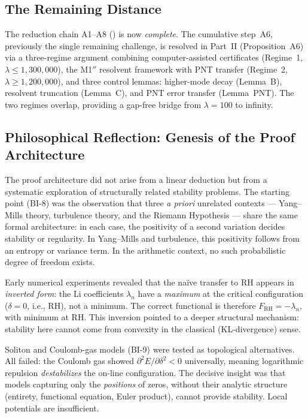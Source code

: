 \documentclass[12pt,a4paper]{article}
\theoremstyle{definition}
\theoremstyle{remark}
\begin{document}
\subsection{The Remaining Distance}

The reduction chain A1--A8 () is now \emph{complete}. The cumulative step~A6, previously the single remaining challenge, is resolved in Part~II (Proposition~A6) via a three-regime argument combining computer-assisted certificates (Regime~1, $\lambda \leq 1{,}300{,}000$), the M1$''$ resolvent framework with PNT transfer (Regime~2, $\lambda \geq 1{,}200{,}000$), and three control lemmas: higher-mode decay (Lemma~B), resolvent truncation (Lemma~C), and PNT error transfer (Lemma~PNT). The two regimes overlap, providing a gap-free bridge from $\lambda = 100$ to infinity.

\subsection{Philosophical Reflection: Genesis of the Proof Architecture}

The proof architecture did not arise from a linear deduction but from a systematic exploration of structurally related stability problems. The starting point (BI-8) was the observation that three \emph{a priori} unrelated contexts --- Yang--Mills theory, turbulence theory, and the Riemann Hypothesis --- share the same formal architecture: in each case, the positivity of a second variation decides stability or regularity. In Yang--Mills and turbulence, this positivity follows from an entropy or variance term. In the arithmetic context, no such probabilistic degree of freedom exists.

Early numerical experiments revealed that the na\"ive transfer to RH appears in \emph{inverted form}: the Li coefficients $\lambda_n$ have a \emph{maximum} at the critical configuration ($\delta = 0$, i.e., RH), not a minimum. The correct functional is therefore $F_{\mathrm{RH}} = -\lambda_n$, with minimum at RH. This inversion pointed to a deeper structural mechanism: stability here cannot come from convexity in the classical (KL-divergence) sense.

Soliton and Coulomb-gas models (BI-9) were tested as topological alternatives. All failed: the Coulomb gas showed $\partial^2 E/\partial\delta^2 < 0$ universally, meaning logarithmic repulsion \emph{destabilizes} the on-line configuration. The decisive insight was that models capturing only the \emph{positions} of zeros, without their analytic structure (entirety, functional equation, Euler product), cannot provide stability. Local potentials are insufficient.
\end{document}
